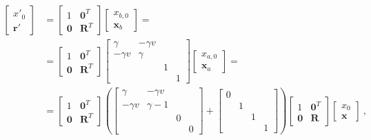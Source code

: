 \documentclass[letterpaper,10pt,english]{jupyterBook}
\begin{document}
\begin{equation*}
\begin{split}\begin{aligned}
  \begin{bmatrix} x'_0 \\ \mathbf{r}' \end{bmatrix}
  & = \begin{bmatrix} 1 & \mathbf{0}^T \\ \mathbf{0} & \mathbf{R}^T \end{bmatrix} \begin{bmatrix} x_{b,0} \\ \mathbf{x}_b \end{bmatrix} = \\
  & = \begin{bmatrix} 1 & \mathbf{0}^T \\ \mathbf{0} & \mathbf{R}^T \end{bmatrix} \begin{bmatrix} \gamma & - \gamma v & & \\ - \gamma v & \gamma & & \\ & & 1 & \\ & & & 1 \end{bmatrix} \begin{bmatrix} x_{a,0} \\ \mathbf{x}_a \end{bmatrix}   = \\
  & = \begin{bmatrix} 1 & \mathbf{0}^T \\ \mathbf{0} & \mathbf{R}^T \end{bmatrix} \left(  \begin{bmatrix} \gamma & - \gamma v & & \\ - \gamma v & \gamma - 1 & & \\ & & 0 &  \\ & & &  0 \end{bmatrix} + \begin{bmatrix} 0 & & & \\ & 1 & & \\ & & 1 & \\ & & & 1 \end{bmatrix} \right) \begin{bmatrix} 1 & \mathbf{0}^T \\ \mathbf{0} & \mathbf{R} \end{bmatrix}  \begin{bmatrix} x_{0} \\ \mathbf{x} \end{bmatrix} \ ,
\end{aligned}\end{split}
\end{equation*}
\end{document}
